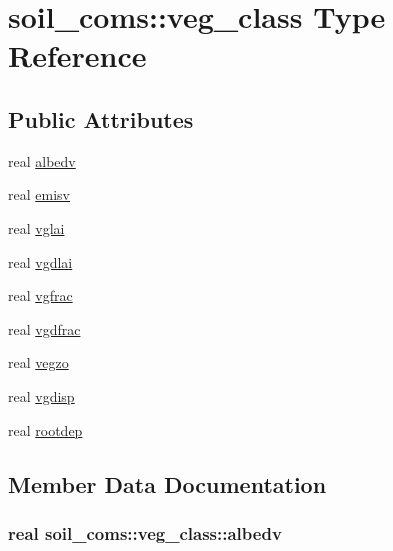 \hypertarget{structsoil__coms_1_1veg__class}{}\section{soil\+\_\+coms\+:\+:veg\+\_\+class Type Reference}
\label{structsoil__coms_1_1veg__class}
\subsection*{Public Attributes}
\begin{DoxyCompactItemize}
\item 
real \hyperlink{structsoil__coms_1_1veg__class_ad7e67d1eb454e0d615a370ef2b9154e7}{albedv}
\item 
real \hyperlink{structsoil__coms_1_1veg__class_abc66ee046d6e2b81d0c4f4e1edbfc5f9}{emisv}
\item 
real \hyperlink{structsoil__coms_1_1veg__class_a58b0bcf4172f42506d04a7253716218d}{vglai}
\item 
real \hyperlink{structsoil__coms_1_1veg__class_abb7597f50b6c8385af74302a006f8adc}{vgdlai}
\item 
real \hyperlink{structsoil__coms_1_1veg__class_a9b7ae82034658e541d67b317ae16113b}{vgfrac}
\item 
real \hyperlink{structsoil__coms_1_1veg__class_a5bd543b0f35ffaa5f96099166bbf7308}{vgdfrac}
\item 
real \hyperlink{structsoil__coms_1_1veg__class_a92986a414c313ee0032828d22b644a25}{vegzo}
\item 
real \hyperlink{structsoil__coms_1_1veg__class_a203569a49361b89f526eaa821013b8b7}{vgdisp}
\item 
real \hyperlink{structsoil__coms_1_1veg__class_a3cc2625fcf60fc2d0822fd567837d355}{rootdep}
\end{DoxyCompactItemize}


\subsection{Member Data Documentation}
\subsubsection[{\texorpdfstring{albedv}{albedv}}]{\setlength{\rightskip}{0pt plus 5cm}real soil\+\_\+coms\+::veg\+\_\+class\+::albedv}\hypertarget{structsoil__coms_1_1veg__class_ad7e67d1eb454e0d615a370ef2b9154e7}{}\label{structsoil__coms_1_1veg__class_ad7e67d1eb454e0d615a370ef2b9154e7}
